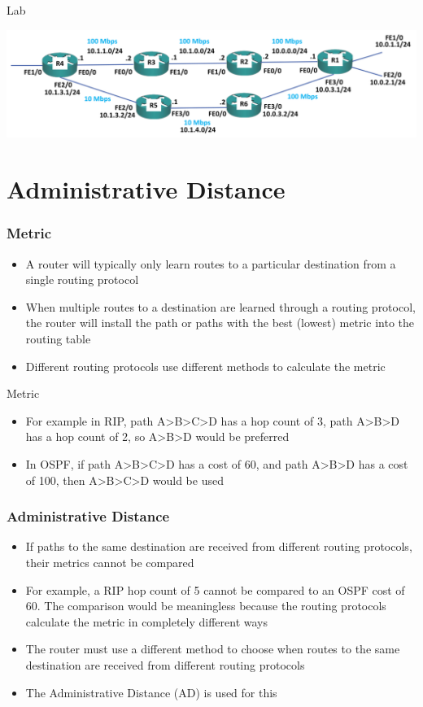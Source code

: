 \documentclass[pdflatex,compress,mathserif]{beamer}
\begin{document}
\begin{frame}{Lab}
	\begin{center}
		\includegraphics[width=\linewidth]{img/img27}
	\end{center}
\end{frame}

\section{Administrative Distance}

\begin{frame}
	\frametitle{Metric}
	\begin{itemize}
		\item A router will typically only learn routes to a particular destination from a
single routing protocol
		\item When multiple routes to a destination are learned through a routing
protocol, the router will install the path or paths with the best (lowest)
metric into the routing table
		\item Different routing protocols use different methods to calculate the metric
	\end{itemize}
\end{frame}

\begin{frame}{Metric}
	\begin{itemize}
		\item For example in RIP, path A>B>C>D has a hop count of 3, path A>B>D has a
hop count of 2, so A>B>D would be preferred
		\item In OSPF, if path A>B>C>D has a cost of 60, and path A>B>D has a cost of
100, then A>B>C>D would be used
	\end{itemize}
\end{frame}

\begin{frame}
	\frametitle{Administrative Distance}
	\begin{itemize}
		\item If paths to the same destination are received from different routing
protocols, their metrics cannot be compared
		\item For example, a RIP hop count of 5 cannot be compared to an OSPF cost of
60. The comparison would be meaningless because the routing protocols
calculate the metric in completely different ways
		\item The router must use a different method to choose when routes to the
same destination are received from different routing protocols
		\item The Administrative Distance (AD) is used for this
	\end{itemize}
\end{frame}
\end{document}

